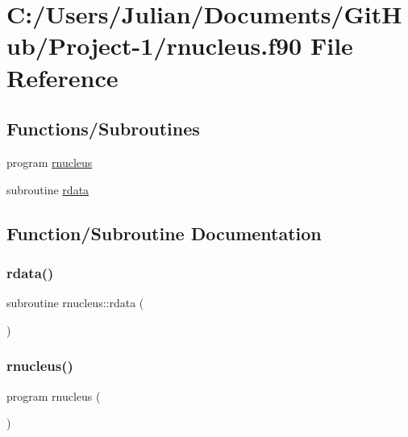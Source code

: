 \hypertarget{rnucleus_8f90}{}\section{C\+:/\+Users/\+Julian/\+Documents/\+Git\+Hub/\+Project-\/1/rnucleus.f90 File Reference}
\label{rnucleus_8f90}
\subsection*{Functions/\+Subroutines}
\begin{DoxyCompactItemize}
\item 
program \mbox{\hyperlink{rnucleus_8f90_a56a1a777539e1bb42b8a628e10cbbd06}{rnucleus}}
\item 
subroutine \mbox{\hyperlink{rnucleus_8f90_a9316fac30381428af80dbdba354f78b2}{rdata}}
\end{DoxyCompactItemize}


\subsection{Function/\+Subroutine Documentation}
\mbox{\label{rnucleus_8f90_a9316fac30381428af80dbdba354f78b2}} 
\subsubsection{\texorpdfstring{rdata()}{rdata()}}
{\footnotesize\ttfamily subroutine rnucleus\+::rdata (\begin{DoxyParamCaption}{ }\end{DoxyParamCaption})}

\mbox{\label{rnucleus_8f90_a56a1a777539e1bb42b8a628e10cbbd06}} 
\subsubsection{\texorpdfstring{rnucleus()}{rnucleus()}}
{\footnotesize\ttfamily program rnucleus (\begin{DoxyParamCaption}{ }\end{DoxyParamCaption})}

